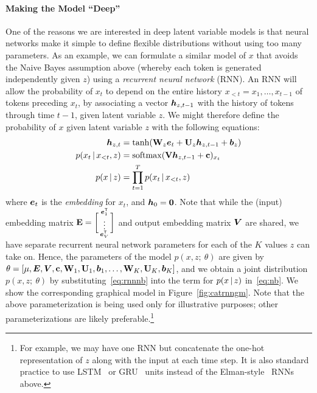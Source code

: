 \documentclass{article}
\begin{document}
\paragraph{Making the Model ``Deep''} One of the reasons we are interested in deep latent variable models is that neural networks make it simple to define flexible distributions without using too many parameters. As an example, 
we can formulate a similar model of $x$ that avoids the Naive Bayes assumption above (whereby each token is generated independently given $z$) using a \emph{recurrent neural network} (RNN). An RNN will allow the probability of $x_{t}$ to depend on the entire history $x_{<t} = x_1, \dots, x_{t-1}$ of tokens preceding $x_{t}$, by associating a vector $\boldsymbol{h}_{z, t-1}$ with the history of tokens through time $t-1$, given latent variable $z$. We might therefore define the probability of $x$ given latent variable $z$ with the following equations: 
\begin{align} \label{eq:rnnnb}
\boldsymbol{h}_{z,t} &= \tanh(\mathbf{W}_z \boldsymbol{e}_t +\mathbf{U}_z\boldsymbol{h}_{z,t-1}  + \boldsymbol{b}_{z}) \nonumber \\
p(x_{t} \,|\, x_{<t} , z) &= \operatorname*{softmax}(\mathbf{V} \boldsymbol{h}_{z, t-1} + \mathbf{c})_{x_{t}} \nonumber \\
p(x \,|\, z) &= \prod_{t=1}^{T} p(x_{t} \,|\, x_{<t} , z) 
\end{align}
where $\boldsymbol{e}_t$ is the \textit{embedding} for $x_t$, and $\boldsymbol{h}_0 = \mathbf{0}$. Note that while
the (input) embedding matrix $\mathbf{E} = \biggl[ \begin{smallmatrix} \boldsymbol{e}_1^{\mathsf{T}} \\ \vdots \\ \boldsymbol{e}_V^{\mathsf{T}}  \end{smallmatrix} \biggr]$ and output embedding matrix $\boldsymbol{V}$ are shared, we have separate recurrent neural network parameters for each of the $K$ values $z$ can take on. Hence, the parameters of the model  $p(x , z ; \ \theta)$ are given by
$\theta = [\mu, \boldsymbol{E}, \boldsymbol{V}, \mathbf{c}, \mathbf{W}_1, \mathbf{U}_1, \boldsymbol{b}_1, \ldots, \mathbf{W}_K, \mathbf{U}_K, \boldsymbol{b}_K]$, and we obtain a joint distribution $p(x, z ; \ \theta)$ by substituting~\eqref{eq:rnnnb} into the term for $p(x \,|\, z)$ in~\eqref{eq:nb}. We show the corresponding graphical model in Figure~\ref{fig:catrnngm}. Note that the above parameterization is being used only for illustrative purposes; other parameterizations are likely preferable.\footnote{For example, we may have one RNN but concatenate the one-hot representation of $z$ along with the input at each time step. It is  also standard practice to use LSTM~\citep{hochreiter1997long} or GRU~\citep{Cho2014} units instead of the Elman-style~\citep{elman1990} RNNs above.} 
\end{document}
